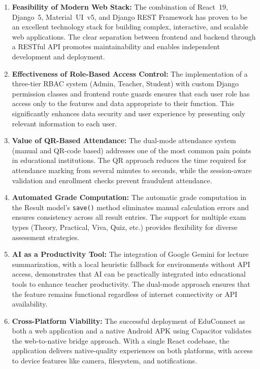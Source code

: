 \begin{enumerate}[label=\arabic*., leftmargin=2em]
    \item \textbf{Feasibility of Modern Web Stack:} The combination of React~19, Django~5, Material~UI~v5, and Django REST Framework has proven to be an excellent technology stack for building complex, interactive, and scalable web applications. The clear separation between frontend and backend through a RESTful API promotes maintainability and enables independent development and deployment.
    
    \item \textbf{Effectiveness of Role-Based Access Control:} The implementation of a three-tier RBAC system (Admin, Teacher, Student) with custom Django permission classes and frontend route guards ensures that each user role has access only to the features and data appropriate to their function. This significantly enhances data security and user experience by presenting only relevant information to each user.
    
    \item \textbf{Value of QR-Based Attendance:} The dual-mode attendance system (manual and QR-code based) addresses one of the most common pain points in educational institutions. The QR approach reduces the time required for attendance marking from several minutes to seconds, while the session-aware validation and enrollment checks prevent fraudulent attendance.
    
    \item \textbf{Automated Grade Computation:} The automatic grade computation in the Result model's \texttt{save()} method eliminates manual calculation errors and ensures consistency across all result entries. The support for multiple exam types (Theory, Practical, Viva, Quiz, etc.) provides flexibility for diverse assessment strategies.
    
    \item \textbf{AI as a Productivity Tool:} The integration of Google Gemini for lecture summarization, with a local heuristic fallback for environments without API access, demonstrates that AI can be practically integrated into educational tools to enhance teacher productivity. The dual-mode approach ensures that the feature remains functional regardless of internet connectivity or API availability.
    
    \item \textbf{Cross-Platform Viability:} The successful deployment of EduConnect as both a web application and a native Android APK using Capacitor validates the web-to-native bridge approach. With a single React codebase, the application delivers native-quality experiences on both platforms, with access to device features like camera, filesystem, and notifications.
    

\end{enumerate}
